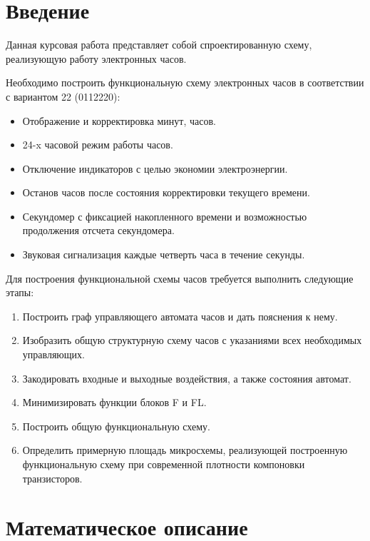 \documentclass[10pt,a4paper,final]{article} %
\begin{document}
\tableofcontents

\newpage
{}
\section*{Введение}
Данная курсовая работа представляет собой спроектированную схему, реализующую работу электронных часов.

Необходимо построить функциональную схему электронных часов в соответствии с вариантом 22 (0112220):
\begin{itemize}
	\item Отображение и корректировка минут, часов.
	\item 24-x часовой режим работы часов.
	\item Отключение индикаторов с целью экономии электроэнергии.
	\item Останов часов после состояния корректировки текущего времени.
	\item Секундомер с фиксацией накопленного времени и возможностью продолжения отсчета секундомера.
	\item Звуковая сигнализация каждые четверть часа в течение секунды.
\end{itemize}

\noindent Для построения функциональной схемы часов требуется выполнить следующие этапы:
\begin{enumerate}
	\item Построить граф управляющего автомата часов и дать пояснения к нему.
	\item Изобразить общую структурную схему часов с указаниями всех необходимых управляющих.
	\item Закодировать входные и выходные воздействия, а также  состояния автомат.
	\item  Минимизировать функции блоков F и FL.
	\item Построить общую функциональную схему.
	\item Определить примерную площадь микросхемы, реализующей построенную функциональную схему при современной плотности компоновки транзисторов.
\end{enumerate}




\newpage
\section{Математическое описание}
\end{document}
